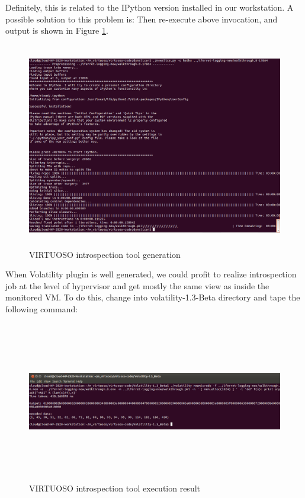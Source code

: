 Definitely, this is related to the IPython version installed in our workstation. A possible solution to this problem is:
Then re-execute above invocation, and output is shown in Figure \ref{fig:VIRTUOSO introspection tool generation}.
\begin{figure}[htbp]
	\centering
		\includegraphics[width=14cm, height= 9cm ]{Figures/Figure38.png}
	\caption[VIRTUOSO introspection tool generation]{VIRTUOSO introspection tool generation}
	\label{fig:VIRTUOSO introspection tool generation}
\end{figure}
When Volatility plugin is well generated, we could profit to realize introspection job at the level of hypervisor and get mostly the 
same view as inside the monitored VM. To do this, change into volatility-1.3-Beta directory and tape the following command:

\begin{figure}[htbp]
	\centering
		\includegraphics[width=14cm, height= 7cm ]{Figures/Figure39.png}
	\caption[VIRTUOSO introspection tool execution result]{VIRTUOSO introspection tool execution result}
	\label{fig:VIRTUOSO introspection tool execution result}
\end{figure}

